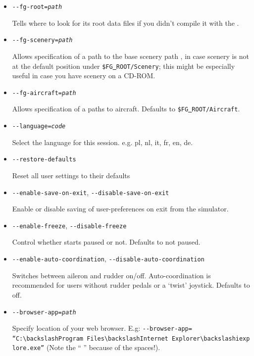 \begin{itemize}
{\begin{itemize}
  Display the current \FlightGear{} version.

  \item{\texttt{-$ $-fg-root={\it path}}}

    Tells \FlightGear{} where to look for its root data files if you
    didn't compile it with the .

  \item{\texttt{-$ $-fg-scenery={\it path}}}

    Allows specification of a path to the base scenery path
    , in case scenery is not at the default
    position under \texttt{\$FG\underline{~}ROOT/Scenery}; this might
    be especially useful in case you have scenery on a CD-ROM.

  \item{\texttt{-$ $-fg-aircraft={\it path}}}

    Allows specification of a paths to aircraft. Defaults to
    \texttt{\$FG\underline{~}ROOT/Aircraft}.

  \item{\texttt{-$ $-language={\it code}}}

    Select the language for this session. e.g. pl, nl, it, fr, en, de.

  \item{\texttt{-$ $-restore-defaults}}

    Reset all user settings to their defaults

  \item{\texttt{-$ $-enable-save-on-exit}, \texttt{-$ $-disable-save-on-exit}}

    Enable or disable saving of user-preferences on exit from the simulator.

  \item{\texttt{-$ $-enable-freeze}, \texttt{-$ $-disable-freeze}}

    Control whether \FlightGear{} starts paused or not. Defaults to not paused.

  \item{\texttt{-$ $-enable-auto-coordination}, \texttt{-$ $-disable-auto-coordination}}

    Switches  between aileron and rudder on/off. Auto-coordination
    is recommended for users without rudder pedals or a `twist' joystick. Defaults to off.

  \item{\texttt{-$ $-browser-app={\it path}}}

    Specify location of your web browser. E.g:
    \texttt{-$ $-browser-app=}\\
    \texttt{``C:$\backslash$Program~Files$\backslash$Internet~Explorer$\backslash$iexplore.exe''}
    (Note the `` '' because of the spaces!).


\end{itemize}}
\end{itemize}
